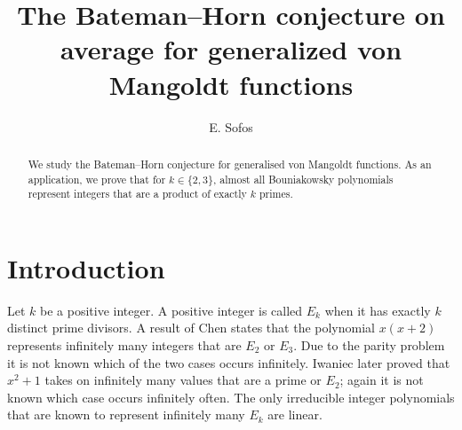 \documentclass[reqno, 11pt]{amsart}
\title
[The Bateman--Horn conjecture on average for generalized von Mangoldt Functions]
{The Bateman--Horn conjecture on average for generalized von Mangoldt functions}
\author{E. Sofos}
\date{}
\numberwithin{equation}{section}
\theoremstyle{definition}
\newcommand{\0}{\mathbf{0}}
\renewcommand{\#}{\sharp}
\begin{document}
 
\begin{abstract} We study 
the 
Bateman--Horn conjecture for generalised von Mangoldt functions. 
As an application, we prove that for $k \in \{2, 3\}$, almost all Bouniakowsky polynomials 
represent integers that are a product of exactly $k$ primes.
\end{abstract} 


\maketitle

\setcounter{tocdepth}{1}

\tableofcontents 



\section{Introduction}   \label{s:intro}  
Let $k$ be a positive integer.
A positive integer is called 
$E_k$ when it has  
exactly $k$ distinct prime divisors.
A result of Chen \cite{Chen} states that 
the polynomial $x(x+2)$ represents infinitely many
integers that are $E_2$ or $E_3$. Due to the parity problem
it is not known which of the two cases occurs infinitely.
Iwaniec \cite{MR485740} later proved 
that $x^2+1$ takes on infinitely many values that are a 
prime or $E_2$; 
again it is not known which case occurs infinitely often.  
 The only  
irreducible integer polynomials 
that are known to represent 
infinitely many $E_k$  are linear. 
\end{document}
